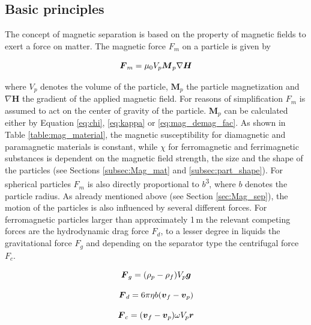 \subsection{Basic principles}
\label{subsec:bas_princ}
The concept of magnetic separation is based on the property of magnetic fields to exert a force on matter. The magnetic force $F_{m}$ on a particle is given by

\begin{equation}
\label{eq:mag_force}
\centering
\boldsymbol{F}_{m} = \mu_{0}V_{p}\boldsymbol{M}_{p}\nabla\boldsymbol{H}
\end{equation}

where $V_{p}$ denotes the volume of the particle, $\boldsymbol{M}_{p}$ the particle magnetization and $\nabla\boldsymbol{H}$ the gradient of the applied magnetic field. For reasons of simplification $F_{m}$ is assumed to act on the center of gravity of the particle. $\boldsymbol{M}_{p}$ can be calculated either by Equation \ref{eq:chi}, \ref{eq:kappa} or \ref{eq:mag_demag_fac}. As shown in Table \ref{table:mag_material}, the magnetic susceptibility for diamagnetic and paramagnetic materials is constant, while $\chi$ for ferromagnetic and ferrimagnetic substances is dependent on the magnetic field strength, the size and the shape of the particles (see Sections \ref{subsec:Mag_mat} and \ref{subsec:part_shape}). For spherical particles $F_{m}$ is also directly proportional to $b$\textsuperscript{3}, where $b$ denotes the particle radius. \newline
As already mentioned above (see Section \ref{sec:Mag_sep}), the motion of the particles is also influenced by several different  forces. For ferromagnetic particles larger than approximately 1\,\textmu m the relevant competing forces are  the hydrodynamic drag force $F_{d}$, to a lesser degree in liquids the gravitational force $F_{g}$ and depending on the separator type the centrifugal force $F_{c}$.  


\begin{equation}
\label{eq:grav_force}
\centering
\boldsymbol{F}_{g} = (\rho_{p}-\rho_{f})V_{p}\boldsymbol{g}
\end{equation}

\begin{equation}
\label{eq:drag_force}
\centering
\boldsymbol{F}_{d} = 6\pi\eta b(\boldsymbol{v}_{f}-\boldsymbol{v}_{p})
\end{equation}

\begin{equation}
\label{eq:cent_force}
\centering
\boldsymbol{F}_{c} = (\boldsymbol{v}_{f}-\boldsymbol{v}_{p})\omega V_{p}\boldsymbol{r}
\end{equation}

